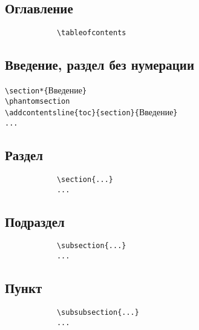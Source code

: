 \documentclass[14pt, a4paper, titlepage]{extarticle}
\renewcommand{\thesection}{\Asbuk{section}}
\let\oldsec\section
\renewcommand{\section}{
        \clearpage
        \phantomsection
        \refstepcounter{section}
        \addcontentsline{toc}{section}{\appendixname~\thesection}

        \oldsec*}
\begin{document}
        \subsection{Оглавление}
            \begin{verbatim}
            \tableofcontents
            \end{verbatim}

        \subsection{Введение, раздел без нумерации}
            \noindent\verb"\section*{"Введение\verb"}"\\
            \verb"\phantomsection"\\
            \verb"\addcontentsline{toc}{section}{"Введение\verb"}"\\
            \verb"..."

        \subsection{Раздел}
            \begin{verbatim}
            \section{...}
            ...
            \end{verbatim}

        \subsection{Подраздел}
            \begin{verbatim}
            \subsection{...}
            ...
            \end{verbatim}

        \subsection{Пункт}
            \begin{verbatim}
            \subsubsection{...}
            ...
            \end{verbatim}
\end{document}
